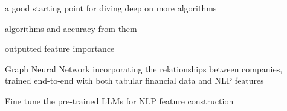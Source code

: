 \documentclass{article}
\begin{document}
    a good starting point for diving deep on more algorithms

    algorithms and accuracy from them

    outputted feature importance

    Graph Neural Network incorporating the relationships between companies, trained end-to-end with both tabular financial data and NLP features
    

    Fine tune the pre-trained LLMs for NLP feature construction
    
    \clearpage
    \newpage

    
    



\end{document}
